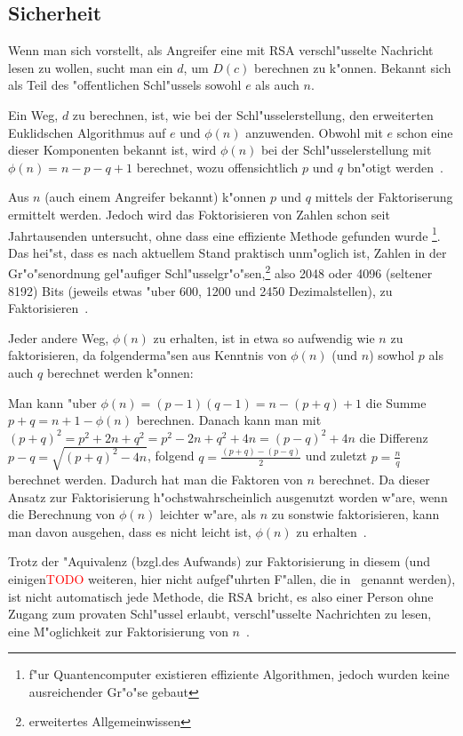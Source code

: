 \documentclass[12pt]{article}
\newcommand{\todo}[1]{\textcolor{red}{\mbox{TODO}}\marginpar{\textcolor{red}{#1}}}
\begin{document}
\subsection{Sicherheit}

Wenn man sich vorstellt, als Angreifer eine mit RSA verschl"usselte Nachricht
lesen zu wollen, sucht man ein $d$, um $D(c)$ berechnen zu k"onnen.
Bekannt sich als Teil des "offentlichen Schl"ussels sowohl $e$ als auch $n$.

Ein Weg, $d$ zu berechnen, ist, wie bei der Schl"usselerstellung,
den erweiterten Euklidschen Algorithmus auf $e$ und $\phi(n)$ anzuwenden.
Obwohl mit $e$ schon eine dieser Komponenten bekannt ist, wird $\phi(n)$
bei der Schl"usselerstellung mit $\phi(n) = n - p - q + 1$ berechnet,
wozu offensichtlich $p$ und $q$ bn"otigt werden~\cite{rsa}.

Aus $n$ (auch einem Angreifer bekannt) k"onnen $p$ und $q$ mittels der Faktoriserung ermittelt werden.
Jedoch wird das Foktorisieren von Zahlen schon seit Jahrtausenden untersucht,
ohne dass eine effiziente Methode gefunden wurde%
\footnote{f"ur Quantencomputer existieren effiziente Algorithmen,
jedoch wurden keine ausreichender Gr"o"se gebaut}.
Das hei"st, dass es nach aktuellem Stand praktisch unm"oglich ist,
Zahlen in der Gr"o"senordnung gel"aufiger Schl"usselgr"o"sen,\footnote{erweitertes Allgemeinwissen}
also 2048 oder 4096 (seltener 8192) Bits (jeweils etwas "uber 600, 1200 und 2450 Dezimalstellen),
zu Faktorisieren~\cite{sinews}.

Jeder andere Weg, $\phi(n)$ zu erhalten, ist in etwa so aufwendig wie $n$ zu faktorisieren,
da folgenderma"sen aus Kenntnis von $\phi(n)$ (und $n$) sowhol $p$ als auch $q$ berechnet werden k"onnen:

Man kann "uber $\phi(n) = (p-1)(q-1) = n - (p+q) + 1$ die Summe $p+q = n + 1 - \phi(n)$ berechnen.
Danach kann man mit $(p+q)^2 = p^2 + 2n + q^2 = p^2 - 2n + q^2 + 4n = (p-q)^2 + 4n$
die Differenz $p-q = \sqrt{(p+q)^2 - 4n}$, folgend $q = \frac{(p+q) - (p-q)}{2}$
und zuletzt $p = \frac{n}{q}$ berechnet werden.
Dadurch hat man die Faktoren von $n$ berechnet.
Da dieser Ansatz zur Faktorisierung h"ochstwahrscheinlich ausgenutzt worden w"are,
wenn die Berechnung von $\phi(n)$ leichter w"are, als $n$ zu sonstwie faktorisieren,
kann man davon ausgehen, dass es nicht leicht ist, $\phi(n)$ zu erhalten~\cite{rsa}.

Trotz der "Aquivalenz (bzgl.\@ des Aufwands) zur Faktorisierung in diesem (und einigen\todo{eigentlich nur einer} weiteren,
hier nicht aufgef"uhrten F"allen, die in~\cite{rsa} genannt werden),
ist nicht automatisch jede Methode, die RSA bricht,
es also einer Person ohne Zugang zum provaten Schl"ussel erlaubt, verschl"usselte Nachrichten zu lesen,
eine M"oglichkeit zur Faktorisierung von $n$~\cite{sinews}.
\end{document}
